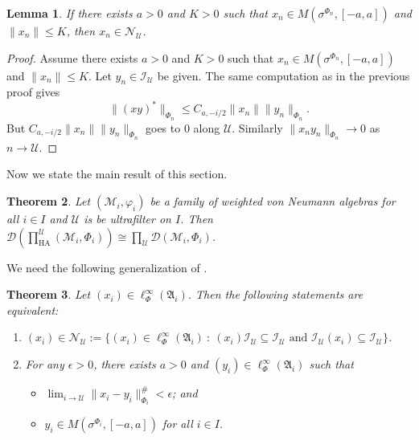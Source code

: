 \documentclass[12pt]{amsart}
\newtheorem{thm}{Theorem}[section]
\newtheorem{lem}[thm]{Lemma}
\theoremstyle{definition}
\def\vp{\varphi}
\def\cal{\mathcal}
\newcommand\cU{{\cal U}}
\def \HA{\operatorname{HA}}
\begin{document}
\begin{lem}\label{modcommutelem2}
    If there exists $a > 0$ and $K > 0$ such that $x_n \in M(\sigma^{\Phi_{n}},[-a,a])$ and $\|x_n\| \leq K$, then $x_n \in \cal N_{\cU}$.
\end{lem}

\begin{proof}
     Assume there exists $a > 0$ and $K > 0$ such that $x_n \in M(\sigma^{\Phi_{n}},[-a,a])$ and $\|x_n\| \leq K$.  Let $y_n \in \cal I_{\cU}$ be given.  The same computation as in the previous proof gives
     \[
     \|(xy)^*\|_{\Phi_n} \leq C_{a, -i/2}\|x_n\|\|y_n\|_{\Phi_n}.
     \]
     But $C_{a, -i/2}\|x_n\|\|y_n\|_{\Phi_n}$ goes to $0$ along $\cU$.  Similarly $\|x_n y_n\|_{\Phi_n} \to 0$ as $n \to \cU$.
\end{proof}

Now we state the main result of this section.

\begin{thm}\label{ultrapres}
Let $(\cal M_i,\vp_i)$ be a family of weighted von Neumann algebras for all $i \in I$ and $\cU$ is be ultrafilter on $I$.  Then $\mathcal{D}\left(\prod_{\HA}^{\cU} (\cal M_i,\Phi_i)\right)\cong \prod_\cU \mathcal{D}\left(\cal M_i,\Phi_i\right)$.
\end{thm}

We need the following generalization of \cite[Proposition 4.11]{AH}.

\begin{thm}\label{ultracontinuous}
    Let $(x_i) \in \ell_{\Phi}^\infty(\mathfrak{A}_i)$.  Then the following statements are equivalent:
    \begin{enumerate}
        \item $(x_i) \in \cal N_{\cU} := \{(x_i) \in \ell_{\Phi}^\infty(\mathfrak{A}_i) \ : \ (x_i) \cal I_{\cU} \subseteq \cal I_{\cU} \text{ and } \cal I_{\cU} (x_i)  \subseteq \cal I_{\cU}\}$.
        \item For any $\epsilon > 0$, there exists $a > 0$ and $(y_i) \in \ell_{\Phi}^\infty(\mathfrak{A}_i)$ such that
        \begin{itemize}
            \item $\lim_{i \to \cU} \|x_i - y_i\|^\#_{\Phi_i} < \epsilon$; and
            \item $y_i \in M(\sigma^{\Phi_i}, [-a, a])$ for all $i \in I$.
        \end{itemize}
    \end{enumerate}
\end{thm}
\end{document}
